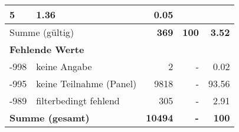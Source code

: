 \begin{longtable}{lXrrr}
       \num{5} &
       \num[round-mode=places,round-precision=2]{1.36} &
         \num[round-mode=places,round-precision=2]{0.05} \\
     \midrule
     \multicolumn{2}{l}{Summe (gültig)} &
       \textbf{\num{369}} &
     \textbf{\num{100}} &
       \textbf{\num[round-mode=places,round-precision=2]{3.52}} \\
     \multicolumn{5}{l}{\textbf{Fehlende Werte}}\\
       -998 &
       keine Angabe &
         \num{2} &
        - &
         \num[round-mode=places,round-precision=2]{0.02} \\
       -995 &
       keine Teilnahme (Panel) &
         \num{9818} &
        - &
         \num[round-mode=places,round-precision=2]{93.56} \\
       -989 &
       filterbedingt fehlend &
         \num{305} &
        - &
         \num[round-mode=places,round-precision=2]{2.91} \\
     \midrule
     \multicolumn{2}{l}{\textbf{Summe (gesamt)}} &
          \textbf{\num{10494}} &
        \textbf{-} &
        \textbf{\num{100}} \\
     \bottomrule
     \end{longtable}
     
